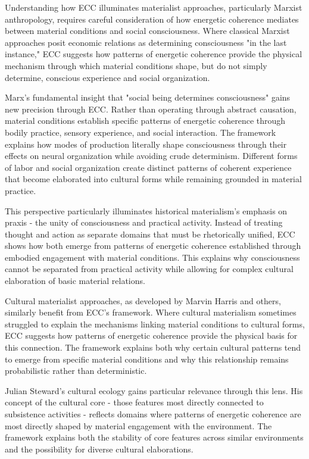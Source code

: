 Understanding how ECC illuminates materialist approaches, particularly Marxist anthropology, requires careful consideration of how energetic coherence mediates between material conditions and social consciousness. Where classical Marxist approaches posit economic relations as determining consciousness "in the last instance," ECC suggests how patterns of energetic coherence provide the physical mechanism through which material conditions shape, but do not simply determine, conscious experience and social organization.

Marx's fundamental insight that "social being determines consciousness" gains new precision through ECC. Rather than operating through abstract causation, material conditions establish specific patterns of energetic coherence through bodily practice, sensory experience, and social interaction. The framework explains how modes of production literally shape consciousness through their effects on neural organization while avoiding crude determinism. Different forms of labor and social organization create distinct patterns of coherent experience that become elaborated into cultural forms while remaining grounded in material practice.

This perspective particularly illuminates historical materialism's emphasis on praxis - the unity of consciousness and practical activity. Instead of treating thought and action as separate domains that must be rhetorically unified, ECC shows how both emerge from patterns of energetic coherence established through embodied engagement with material conditions. This explains why consciousness cannot be separated from practical activity while allowing for complex cultural elaboration of basic material relations.

Cultural materialist approaches, as developed by Marvin Harris and others, similarly benefit from ECC's framework. Where cultural materialism sometimes struggled to explain the mechanisms linking material conditions to cultural forms, ECC suggests how patterns of energetic coherence provide the physical basis for this connection. The framework explains both why certain cultural patterns tend to emerge from specific material conditions and why this relationship remains probabilistic rather than deterministic.

Julian Steward's cultural ecology gains particular relevance through this lens. His concept of the cultural core - those features most directly connected to subsistence activities - reflects domains where patterns of energetic coherence are most directly shaped by material engagement with the environment. The framework explains both the stability of core features across similar environments and the possibility for diverse cultural elaborations.








